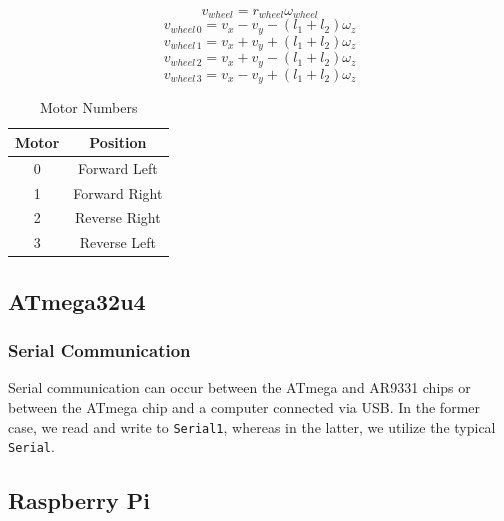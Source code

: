 \documentclass[letterpaper,12pt]{article}
\begin{document}
\begin{equation}
  v_{wheel}=r_{wheel}\omega_{wheel}
  \label{eq:rw_to_v}
\end{equation}
\begin{equation}
  v_{wheel\,0}=v_x-v_y-(l_1+l_2)\omega_z
  \label{eq:v_wheel_1}
\end{equation}
\begin{equation}
  v_{wheel\,1}=v_x+v_y+(l_1+l_2)\omega_z
  \label{eq:v_wheel_2}
\end{equation}
\begin{equation}
  v_{wheel\,2}=v_x+v_y-(l_1+l_2)\omega_z
  \label{eq:v_wheel_3}
\end{equation}
\begin{equation}
  v_{wheel\,3}=v_x-v_y+(l_1+l_2)\omega_z
  \label{eq:v_wheel_4}
\end{equation}

\begin{table}[h!]
  \centering
  \begin{tabular}{| c | c |}
    \hline
    \textbf{Motor} & \textbf{Position} \\
    \hline
    0 & Forward Left \\
    \hline
    1 & Forward Right \\
    \hline
    2 & Reverse Right \\
    \hline
    3 & Reverse Left \\
    \hline
  \end{tabular}
  \caption{Motor Numbers}
  \label{tab:motor_nums}
\end{table}


\subsection{ATmega32u4}

\subsubsection{Serial Communication}
\label{sec:atmega_serial_com}

\noindent Serial communication can occur between the ATmega and AR9331 chips or between the ATmega chip and a computer connected via USB. In the former case, we read and write to \texttt{Serial1}, whereas in the latter, we utilize the typical \texttt{Serial}.


\subsection{Raspberry Pi}
\end{document}
